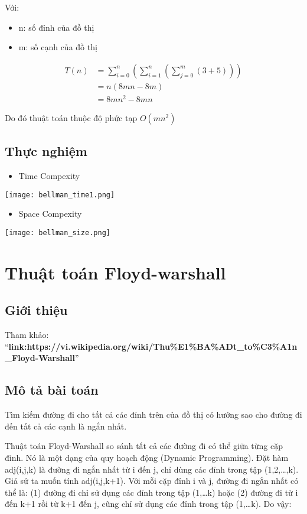 \documentclass[a4paper]{article}
\begin{document}
Với:
\begin{itemize}
    \item n: số đỉnh của đồ thị
    \item m: số cạnh của đồ thị
\end{itemize}

\begin{align*}
    T(n)&=\sum_{i=0}^{n}(\sum_{i=1}^{n}(\sum_{j=0}^{m}(3+5)))\\
    &= n(8mn - 8m) \\
    &= 8mn^2 - 8mn
\end{align*}

Do đó thuật toán thuộc độ phức tạp $O(mn^2)$

\subsection{Thực nghiệm}
\begin{itemize}
    \item Time Compexity
\end{itemize}
\begin{center}
    \texttt{[image: bellman\_time1.png]}
\end{center}
\begin{itemize}
    \item Space Compexity
\end{itemize}
\begin{center}
    \texttt{[image: bellman\_size.png]}
\end{center}

\section{Thuật toán Floyd-warshall}
\subsection{Giới thiệu}
Tham khảo: ``\textbf{link:https://vi.wikipedia.org/wiki/Thu\%E1\%BA\%ADt\_to\%C3\%A1n\_Floyd-Warshall}''


\subsection{Mô tả bài toán}
Tìm kiếm đường đi cho tất cả các đỉnh trên của đồ thị có hướng sao cho đường đi đến tất cả các cạnh là ngắn nhất.

Thuật toán Floyd-Warshall so sánh tất cả các đường đi có thể giữa từng cặp đỉnh. Nó là một dạng của quy hoạch động (Dynamic Programming). Đặt hàm adj(i,j,k) là đường đi ngắn nhất từ i đến j, chỉ dùng các đỉnh trong tập (1,2,…,k). Giả sử ta muốn tính adj(i,j,k+1). Với mỗi cặp đỉnh i và j, đường đi ngắn nhất có thể là: (1) đường đi chỉ sử dụng các đỉnh trong tập (1,…k) hoặc (2) đường đi từ i đến k+1 rồi từ k+1 đến j, cũng chỉ sử dụng các đỉnh trong tập (1,…k). Do vậy:
\end{document}
